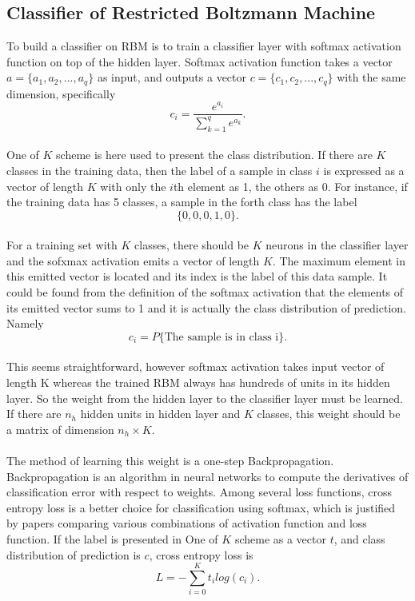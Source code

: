 \documentclass[12pt]{article}
\begin{document}
\subsection{Classifier of Restricted Boltzmann Machine}
To build a classifier on RBM is to train a classifier layer with softmax activation function on top of the hidden layer. Softmax activation function takes a vector $a = \{a_1, a_2,..., a_q\}$ as input, and outputs a vector $c = \{c_1, c_2,..., c_q\}$ with the same dimension, specifically\begin{equation}
c_i = \frac{e^{a_i}}{\sum_{k=1}^q e^{a_k}}.
\end{equation}
\\
One of $K$ scheme is here used to present the class distribution. If there are $K$ classes in the training data, then the label of a sample in class $i$ is expressed as a vector of length $K$ with only the $i$th element as 1, the others as 0. For instance, if the training data has 5 classes, a sample in the forth class has the label\begin{equation}
\{0,0,0,1,0\}.
\end{equation}
\\
For a training set with $K$ classes, there should be $K$ neurons in the classifier layer and the sofxmax activation emits a vector of length $K$. The maximum element in this emitted vector is located and its index is the label of this data sample. It could be found from the definition of the softmax activation that the elements of its emitted vector sums to 1 and it is actually the class distribution of prediction. Namely\begin{equation}
c_i = P\{\text{The sample is in class i}\}.
\end{equation}
\\
This seems straightforward, however softmax activation takes input vector of length K whereas the trained RBM always has hundreds of units in its hidden layer. So the weight from the hidden layer to the classifier layer must be learned. If there are $n_h$ hidden units in hidden layer and $K$ classes, this weight should be a matrix of dimension $n_h\times K$.\\
\\
The method of learning this weight is a one-step Backpropagation. Backpropagation is an algorithm in neural networks to compute the derivatives of classification error with respect to weights. Among several loss functions, cross entropy loss is a better choice for classification using softmax, which is justified by papers comparing various combinations of activation function and loss function. If the label is presented in One of $K$ scheme as a vector $t$, and class distribution of prediction is $c$,  cross entropy loss is \begin{equation}
L = -\sum_{i = 0}^K t_i log(c_i).
\end{equation}
\end{document}

